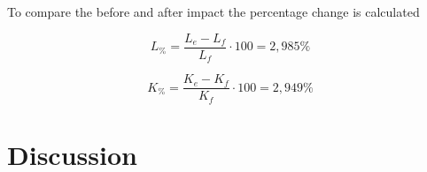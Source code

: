 \documentclass[11pt]{article}
\begin{document}
To compare the before and after impact the percentage change is calculated 

\begin{equation}
L_\%=\frac{L_e-L_f}{L_f}\cdot100=2,985\%
\end{equation}

\begin{equation}
K_\%=\frac{K_e-K_f}{K_f}\cdot100=2,949\%
\end{equation}

\newpage


\section{Discussion}

\end{document}

